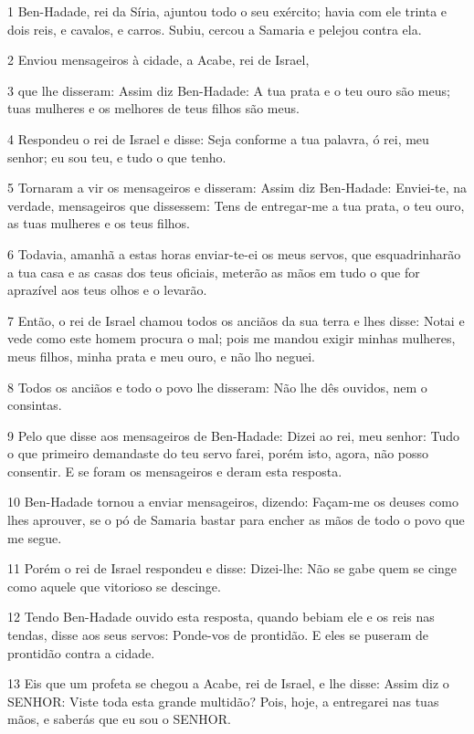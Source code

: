 \par 1 Ben-Hadade, rei da Síria, ajuntou todo o seu exército; havia com ele trinta e dois reis, e cavalos, e carros. Subiu, cercou a Samaria e pelejou contra ela.
\par 2 Enviou mensageiros à cidade, a Acabe, rei de Israel,
\par 3 que lhe disseram: Assim diz Ben-Hadade: A tua prata e o teu ouro são meus; tuas mulheres e os melhores de teus filhos são meus.
\par 4 Respondeu o rei de Israel e disse: Seja conforme a tua palavra, ó rei, meu senhor; eu sou teu, e tudo o que tenho.
\par 5 Tornaram a vir os mensageiros e disseram: Assim diz Ben-Hadade: Enviei-te, na verdade, mensageiros que dissessem: Tens de entregar-me a tua prata, o teu ouro, as tuas mulheres e os teus filhos.
\par 6 Todavia, amanhã a estas horas enviar-te-ei os meus servos, que esquadrinharão a tua casa e as casas dos teus oficiais, meterão as mãos em tudo o que for aprazível aos teus olhos e o levarão.
\par 7 Então, o rei de Israel chamou todos os anciãos da sua terra e lhes disse: Notai e vede como este homem procura o mal; pois me mandou exigir minhas mulheres, meus filhos, minha prata e meu ouro, e não lho neguei.
\par 8 Todos os anciãos e todo o povo lhe disseram: Não lhe dês ouvidos, nem o consintas.
\par 9 Pelo que disse aos mensageiros de Ben-Hadade: Dizei ao rei, meu senhor: Tudo o que primeiro demandaste do teu servo farei, porém isto, agora, não posso consentir. E se foram os mensageiros e deram esta resposta.
\par 10 Ben-Hadade tornou a enviar mensageiros, dizendo: Façam-me os deuses como lhes aprouver, se o pó de Samaria bastar para encher as mãos de todo o povo que me segue.
\par 11 Porém o rei de Israel respondeu e disse: Dizei-lhe: Não se gabe quem se cinge como aquele que vitorioso se descinge.
\par 12 Tendo Ben-Hadade ouvido esta resposta, quando bebiam ele e os reis nas tendas, disse aos seus servos: Ponde-vos de prontidão. E eles se puseram de prontidão contra a cidade.
\par 13 Eis que um profeta se chegou a Acabe, rei de Israel, e lhe disse: Assim diz o SENHOR: Viste toda esta grande multidão? Pois, hoje, a entregarei nas tuas mãos, e saberás que eu sou o SENHOR.
